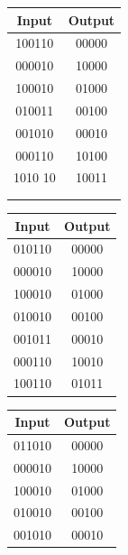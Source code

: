 \begin{table}
\begin{subtable}[h]{0.10\textwidth}
		\label{table:trainingexplanations:one}
	\end{subtable}
	\hspace{3.75cm}
	\begin{subtable}[h]{0.10\textwidth}
		\centering
		\begin{tabular}{cc}
		Input & Output \\
		\hline
		100110	&	00000\\
		000010	&	10000\\
		100010	&	01000\\
		010011	&	00100\\
		001010	&	00010\\
		000110	&	10100\\
		1010	10	&	10011\\
		&\\
		&\\
		\end{tabular}
		\bigskip
		\label{table:trainingexplanations:one}
	\end{subtable}
	\newline
	\begin{subtable}[h]{0.10\textwidth}
		\centering
		\begin{tabular}{cc}
		Input & Output \\
		\hline
		010110	&	00000\\
		000010	&	10000\\
		100010	&	01000\\
		010010	&	00100\\
		001011	&	00010\\
		000110	&	10010\\
		100110	&	01011\\
		\end{tabular}
		\bigskip
		\label{table:trainingexplanations:one}
	\end{subtable}
	\hspace{3.75cm}
	\begin{subtable}[h]{0.10\textwidth}
		\centering
		\begin{tabular}{cc}
		Input & Output \\
		\hline
		011010	&	00000\\
		000010	&	10000\\
		100010	&	01000\\
		010010	&	00100\\
		001010	&	00010\\

\end{tabular}
\end{subtable}
\end{table}
